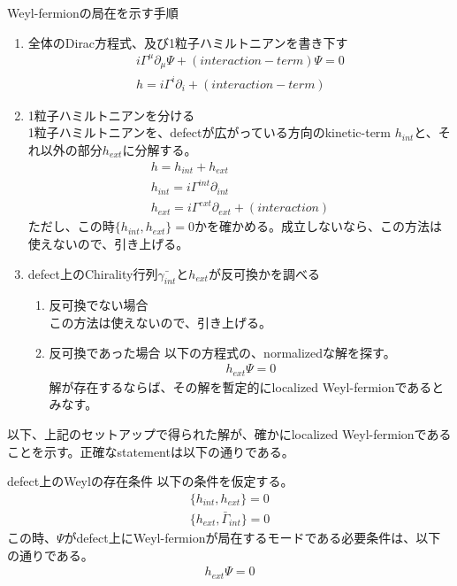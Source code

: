 \documentclass[dvipdfmx,a4paper,10.5pt]{article}
\numberwithin{equation}{section}
\begin{document}
\begin{setupbox}{Weyl-fermionの局在を示す手順}
    \begin{enumerate}
        \item 全体のDirac方程式、及び1粒子ハミルトニアンを書き下す
        \begin{gather*}
            i\Gamma^{\mu}\partial_{\mu}\Psi + (interaction-term)\Psi =0\\
            h=i\Gamma^{i}\partial_{i}+(interaction-term)
        \end{gather*}
        \item 1粒子ハミルトニアンを分ける\\
        1粒子ハミルトニアンを、defectが広がっている方向のkinetic-term $h_{int}$と、それ以外の部分$h_{ext}$に分解する。
        \begin{gather*}
            h=h_{int}+h_{ext}\\
            h_{int}=i\Gamma^{int}\partial_{int}\\
            h_{ext}=i\Gamma^{ext}\partial_{ext}+(interaction)
        \end{gather*}
        ただし、この時$\{h_{int},h_{ext}\}=0$かを確かめる。成立しないなら、この方法は使えないので、引き上げる。
        \item defect上のChirality行列$\bar{\gamma_{int}}$と$h_{ext}$が反可換かを調べる
        \begin{enumerate}
            \item 反可換でない場合\\
            この方法は使えないので、引き上げる。
            \item 反可換であった場合
            以下の方程式の、normalizedな解を探す。
            \begin{align*}
                h_{ext}\Psi=0
            \end{align*}
            解が存在するならば、その解を暫定的にlocalized Weyl-fermionであるとみなす。
        \end{enumerate}
    \end{enumerate}
\end{setupbox}
以下、上記のセットアップで得られた解が、確かにlocalized Weyl-fermionであることを示す。正確なstatementは以下の通りである。
\begin{resultbox}{defect上のWeylの存在条件}
    以下の条件を仮定する。
    \begin{gather*}
        \{h_{int},h_{ext}\}=0\\
        \{h_{ext},\bar{\Gamma}_{int}\}=0
    \end{gather*}
    この時、$\Psi$がdefect上にWeyl-fermionが局在するモードである必要条件は、以下の通りである。
    \begin{align*}
         h_{ext}\Psi =0
    \end{align*}
\end{resultbox}
\end{document}
